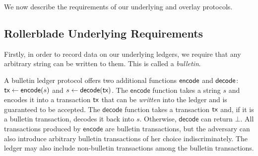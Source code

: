 %
%

We now describe the requirements of our underlying and overlay protocols.

\subsection{Rollerblade Underlying Requirements}

Firstly, in order to record data on our underlying ledgers, we require that any arbitrary string
can be written to them. This is called a \emph{bulletin}.

\myparagraph[Bulletins]
A bulletin ledger protocol offers two additional
functions $\textsf{encode}$ and $\textsf{decode}$:
$\textsf{tx} \gets \textsf{encode}(s)$ and $s \gets \textsf{decode}(\textsf{tx})$.
The $\textsf{encode}$ function takes a string $s$ and encodes it into a transaction $\textsf{tx}$ that can be \emph{written}
into the ledger and is guaranteed to be accepted.
The $\textsf{decode}$ function takes a transaction $\textsf{tx}$
and, if it is a bulletin transaction, decodes it back into $s$.
Otherwise, $\textsf{decode}$ can return $\bot$.
All transactions produced by $\textsf{encode}$
are bulletin transactions, but the adversary can also introduce arbitrary bulletin transactions of her choice
indiscriminately. The ledger may also include non-bulletin transactions among the bulletin transactions.

